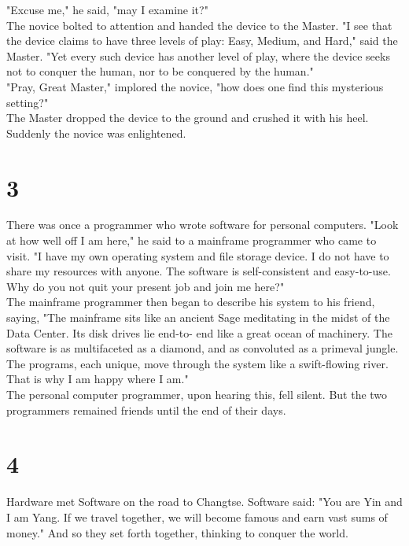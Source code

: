 \documentclass[14pt, letterpaper]{book}
\begin{document}
"Excuse me," he said, "may I examine it?"\\

The novice bolted to attention and handed the device to the Master. "I see that the device claims to have three levels of play: Easy, Medium, and Hard," said the Master. "Yet every such device has another level of play, where the device seeks not to conquer the human, nor to be conquered by the human."\\

"Pray, Great Master," implored the novice, "how does one find this mysterious setting?"\\

The Master dropped the device to the ground and crushed it with his heel. Suddenly the novice was enlightened.

\section*{3}
There was once a programmer who wrote software for personal computers. "Look at how well off I am here," he said to a mainframe programmer who came to visit. "I have my own operating system and file storage device. I do not have to share my resources with anyone. The software is self-consistent and easy-to-use. Why do you not quit your present job and join me here?"\\

The mainframe programmer then began to describe his system to his friend, saying, "The mainframe sits like an ancient Sage meditating in the midst of the Data Center. Its disk drives lie end-to- end like a great ocean of machinery. The software is as multifaceted as a diamond, and as convoluted as a primeval jungle. The programs, each unique, move through the system like a swift-flowing river. That is why I am happy where I am."\\

The personal computer programmer, upon hearing this, fell silent. But the two programmers remained friends until the end of their days.\\

\section*{4}
Hardware met Software on the road to Changtse. Software said: "You are Yin and I am Yang. If we travel together, we will become famous and earn vast sums of money." And so they set forth together, thinking to conquer the world.\\
\end{document}
